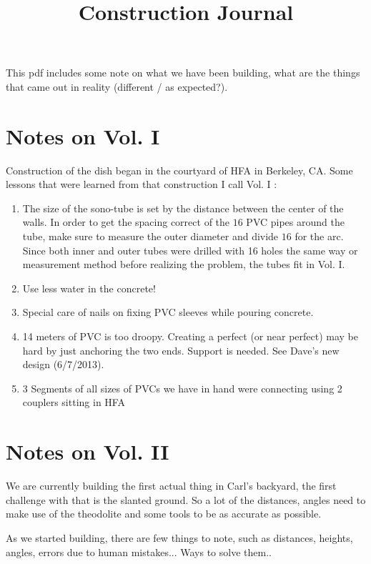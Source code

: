 \documentclass[12pt, letter]{article}
\begin{document}
\title{Construction Journal} \maketitle
This pdf includes some note on what we have been building, what are the things that came out in reality (different / as expected?).


\section{Notes on Vol. I}
Construction of the dish began in the courtyard of HFA in Berkeley, CA.
Some lessons that were learned from that construction I call Vol. I :
\begin{enumerate}
    \item{The size of the sono-tube is set by the distance between the center of
the walls. In order to get the spacing correct of the $16$ PVC pipes around the
tube, make sure to measure the outer diameter and divide $16$ for the arc. Since both inner
and outer tubes were drilled with 16 holes the same way or measurement
method before realizing the problem, the tubes fit in Vol. I.}
    \item{Use less water in the concrete!}
    \item{Special care of nails on fixing PVC sleeves while pouring concrete.}
    \item{14 meters of PVC is too droopy. Creating a perfect (or near perfect)
may be hard by just anchoring the two ends. Support is needed. See Dave's new
design (6/7/2013).}
    \item{3 Segments of all sizes of PVCs we have in hand were
      connecting using 2 couplers sitting in HFA}
\end{enumerate}

\section{Notes on Vol. II}
We are currently building the first actual thing in Carl's backyard, the first challenge with that is the slanted ground. So a lot of the distances, angles need to make use of the theodolite and some tools to be as accurate as possible.
 
As we started building, there are few things to note, such as distances, heights, angles, errors due to human mistakes... Ways to solve them..
\end{document}

